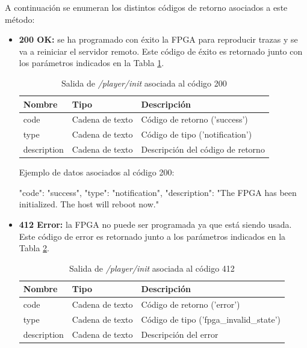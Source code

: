 A continuación se enumeran los distintos códigos de retorno asociados a este método:
\begin{itemize}

\item{\textbf{200 OK:} se ha programado con éxito la \gls{FPGA} para reproducir \glspl{traza} y se va a reiniciar el servidor remoto. Este código de éxito es retornado junto con los parámetros indicados en la Tabla \ref{extra:api:playerinit:ok}.
\begin{table}[H]
\centering
\begin{tabular}{|l|l|l|}
\hline
\rowcolor[HTML]{F5F5F5}
\textbf{Nombre}  & \textbf{Tipo}   & \textbf{Descripción}              \\ \hline
code             & Cadena de texto & Código de retorno ('success')     \\ \hline
type             & Cadena de texto & Código de tipo ('notification')   \\ \hline
description      & Cadena de texto & Descripción del código de retorno \\ \hline
\end{tabular}
\caption{Salida de \textit{/player/init} asociada al código 200}
\label{extra:api:playerinit:ok}
\end{table}
\begin{minipage}{\textwidth}
Ejemplo de datos asociados al código 200:

\begin{code}[language=json]
{
  "code": "success",
  "type": "notification",
  "description": "The FPGA has been initialized. The host will reboot now."
}
\end{code}
\end{minipage}
}

\item{\textbf{412 Error:} la \gls{FPGA} no puede ser programada ya que está siendo usada. Este código de error es retornado junto a los parámetros indicados en la Tabla \ref{extra:api:playerinit:error}.
\begin{table}[H]
\centering
\begin{tabular}{|l|l|l|}
\hline
\rowcolor[HTML]{F5F5F5}
\textbf{Nombre}  & \textbf{Tipo}   & \textbf{Descripción}                    \\ \hline
code             & Cadena de texto & Código de retorno ('error')             \\ \hline
type             & Cadena de texto & Código de tipo ('fpga\_invalid\_state') \\ \hline
description      & Cadena de texto & Descripción del error                   \\ \hline
\end{tabular}
\caption{Salida de \textit{/player/init} asociada al código 412}
\label{extra:api:playerinit:error}
\end{table}

}
\end{itemize}
